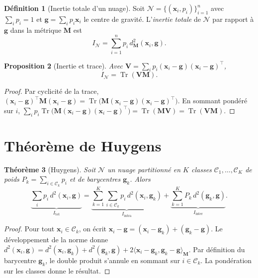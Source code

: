 \documentclass[11pt, a4paper, openany]{book}
\theoremstyle{plain}
\newtheorem{theorem}{Théorème}[chapter]
\newtheorem{proposition}[theorem]{Proposition}
\theoremstyle{definition}
\newtheorem{definition}[theorem]{Définition}
\theoremstyle{remark}
\newcommand{\1}{\mathds{1}}
\DeclareMathOperator{\Tr}{Tr}
\newcommand{\V}{\mathbf{V}}
\newcommand{\M}{\mathbf{M}}
\begin{document}
\begin{definition}[Inertie totale d'un nuage]
Soit $\mathcal{N} = \{(\mathbf{x}_i, p_i)\}_{i=1}^n$ avec $\sum_i p_i = 1$ et
$\mathbf{g} = \sum_i p_i \mathbf{x}_i$ le centre de gravité. L'\textit{inertie totale}
de $\mathcal{N}$ par rapport à $\mathbf{g}$ dans la métrique $\M$ est
\[
I_{\mathcal{N}} = \sum_{i=1}^n p_i\, d_{\M}^2(\mathbf{x}_i, \mathbf{g}).
\]
\end{definition}

\begin{proposition}[Inertie et trace]
Avec $\V = \sum_i p_i (\mathbf{x}_i - \mathbf{g})(\mathbf{x}_i - \mathbf{g})^\top$,
\[
I_{\mathcal{N}} = \Tr(\V \M).
\]
\end{proposition}

\begin{proof}
Par cyclicité de la trace, $(\mathbf{x}_i - \mathbf{g})^\top \M (\mathbf{x}_i - \mathbf{g}) = \Tr\bigl(\M (\mathbf{x}_i - \mathbf{g})(\mathbf{x}_i - \mathbf{g})^\top\bigr)$.
En sommant pondéré sur $i$, $\sum_i p_i \Tr\bigl(\M (\mathbf{x}_i - \mathbf{g})(\mathbf{x}_i - \mathbf{g})^\top\bigr) = \Tr(\M \V) = \Tr(\V \M)$.
\end{proof}

\section{Théorème de Huygens}

\begin{theorem}[Huygens]
Soit $\mathcal{N}$ un nuage partitionné en $K$ classes
$\mathcal{C}_1, \ldots, \mathcal{C}_K$ de poids $P_k = \sum_{i \in \mathcal{C}_k} p_i$
et de barycentres $\mathbf{g}_k$. Alors
\[
\underbrace{\sum_i p_i\, d^2(\mathbf{x}_i, \mathbf{g})}_{I_{\text{tot}}}
=
\underbrace{\sum_{k=1}^K \sum_{i \in \mathcal{C}_k} p_i\, d^2(\mathbf{x}_i, \mathbf{g}_k)}_{I_{\text{intra}}}
+
\underbrace{\sum_{k=1}^K P_k\, d^2(\mathbf{g}_k, \mathbf{g})}_{I_{\text{inter}}}.
\]
\end{theorem}

\begin{proof}
Pour tout $\mathbf{x}_i \in \mathcal{C}_k$, on écrit $\mathbf{x}_i - \mathbf{g} = (\mathbf{x}_i - \mathbf{g}_k) + (\mathbf{g}_k - \mathbf{g})$.
Le développement de la norme donne
$d^2(\mathbf{x}_i, \mathbf{g}) = d^2(\mathbf{x}_i, \mathbf{g}_k) + d^2(\mathbf{g}_k, \mathbf{g}) + 2\langle \mathbf{x}_i - \mathbf{g}_k, \mathbf{g}_k - \mathbf{g}\rangle_{\M}$.
Par définition du barycentre $\mathbf{g}_k$, le double produit s'annule en sommant sur
$i \in \mathcal{C}_k$. La pondération sur les classes donne le résultat.
\end{proof}
\end{document}
